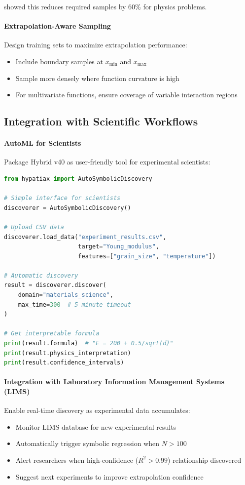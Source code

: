 \citet{udrescu2020ai} showed this reduces required samples by 60\% for physics problems.

\paragraph{Extrapolation-Aware Sampling}
Design training sets to maximize extrapolation performance:
\begin{itemize}
    \item Include boundary samples at $x_{\min}$ and $x_{\max}$
    \item Sample more densely where function curvature is high
    \item For multivariate functions, ensure coverage of variable interaction regions
\end{itemize}

\subsection{Integration with Scientific Workflows}

\paragraph{AutoML for Scientists}
Package Hybrid v40 as user-friendly tool for experimental scientists:

\begin{lstlisting}[language=Python, caption=Proposed User Interface]
from hypatiax import AutoSymbolicDiscovery

# Simple interface for scientists
discoverer = AutoSymbolicDiscovery()

# Upload CSV data
discoverer.load_data("experiment_results.csv", 
                     target="Young_modulus",
                     features=["grain_size", "temperature"])

# Automatic discovery
result = discoverer.discover(
    domain="materials_science",
    max_time=300  # 5 minute timeout
)

# Get interpretable formula
print(result.formula)  # "E = 200 + 0.5/sqrt(d)"
print(result.physics_interpretation)
print(result.confidence_intervals)
\end{lstlisting}

\paragraph{Integration with Laboratory Information Management Systems (LIMS)}
Enable real-time discovery as experimental data accumulates:
\begin{itemize}
    \item Monitor LIMS database for new experimental results
    \item Automatically trigger symbolic regression when $N > 100$
    \item Alert researchers when high-confidence ($R^2 > 0.99$) relationship discovered
    \item Suggest next experiments to improve extrapolation confidence
\end{itemize}

